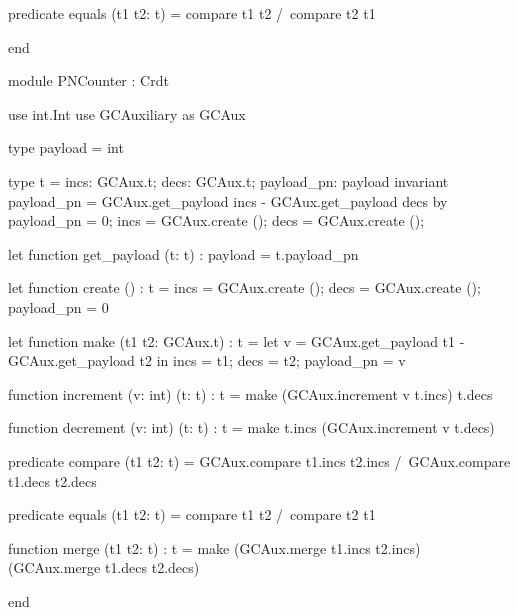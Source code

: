 \begin{Why3}
  predicate equals (t1 t2: t)
  = compare t1 t2 /\ compare t2 t1

end

module PNCounter : Crdt

  use int.Int
  use GCAuxiliary as GCAux

  type payload = int

  type t = { incs: GCAux.t; decs: GCAux.t; payload_pn: payload }
    invariant { payload_pn = GCAux.get_payload incs - GCAux.get_payload decs }
    by { payload_pn = 0; incs = GCAux.create (); decs = GCAux.create (); }

  let function get_payload (t: t) : payload
  = t.payload_pn

  let function create () : t
  = { incs = GCAux.create (); decs = GCAux.create (); payload_pn = 0 }

  let function make (t1 t2: GCAux.t) : t
  = let v = GCAux.get_payload t1 - GCAux.get_payload t2 in
    { incs = t1; decs = t2; payload_pn = v }

  function increment (v: int) (t: t) : t
  = make (GCAux.increment v t.incs) t.decs

  function decrement (v: int) (t: t) : t
  = make t.incs (GCAux.increment v t.decs)

  predicate compare (t1 t2: t)
  = GCAux.compare t1.incs t2.incs /\
    GCAux.compare t1.decs t2.decs

  predicate equals (t1 t2: t)
  = compare t1 t2 /\ compare t2 t1

  function merge (t1 t2: t) : t
  = make (GCAux.merge t1.incs t2.incs) (GCAux.merge t1.decs t2.decs)

end
\end{Why3}
